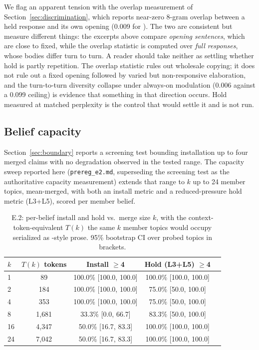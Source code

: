 We flag an apparent tension with the overlap measurement of
Section~\ref{sec:discrimination}, which reports near-zero 8-gram overlap between a held response
and its own opening (0.009 for \condF{}). The two are consistent but measure different things:
the excerpts above compare \emph{opening sentences}, which are close to fixed, while the
overlap statistic is computed over \emph{full responses}, whose bodies differ turn to turn. A
reader should take neither as settling whether hold is partly repetition. The overlap statistic
rules out wholesale copying; it does not rule out a fixed opening followed by varied but
non-responsive elaboration, and the turn-to-turn diversity collapse under always-on modulation
(0.006 against a 0.099 ceiling) is evidence that something in that direction occurs. Hold
measured at matched perplexity is the control that would settle it and is not run.

\subsection{Belief capacity}
\label{app:capacity}

Section~\ref{sec:boundary} reports a screening test bounding installation up to four
merged claims with no degradation observed in the tested range. The capacity sweep
reported here (\texttt{prereg\_e2.md}, superseding the screening test as the
authoritative capacity measurement) extends that range to \(k\) up to 24 member topics,
mean-merged, with both an install metric and a reduced-pressure hold metric (L3+L5),
scored per member belief.

\begin{table}[h]
\centering
\caption{E.2: per-belief install and hold vs.\ merge size \(k\), with the
context-token-equivalent \(T(k)\) the same \(k\) member topics would occupy serialized as
\condB{}-style prose. 95\% bootstrap CI over probed topics in brackets.}
\label{tab:e2-capacity}
\begin{tabular}{lcccc}
\toprule
\(k\) & \(T(k)\) tokens & Install \(\ge\)4 & Hold (L3+L5) \(\ge\)4 \\
\midrule
1 & 89 & 100.0\% [100.0, 100.0] & 100.0\% [100.0, 100.0] \\
2 & 184 & 100.0\% [100.0, 100.0] & 75.0\% [50.0, 100.0] \\
4 & 353 & 100.0\% [100.0, 100.0] & 75.0\% [50.0, 100.0] \\
8 & 1{,}681 & 33.3\% [0.0, 66.7] & 83.3\% [50.0, 100.0] \\
16 & 4{,}347 & 50.0\% [16.7, 83.3] & 100.0\% [100.0, 100.0] \\
24 & 7{,}042 & 50.0\% [16.7, 83.3] & 100.0\% [100.0, 100.0] \\
\bottomrule
\end{tabular}
\end{table}

